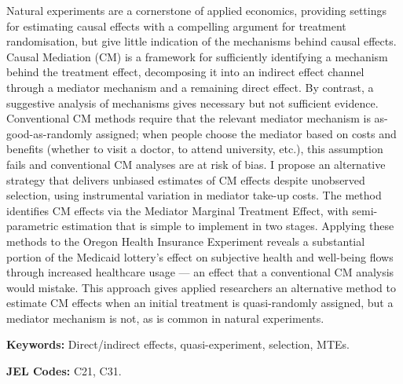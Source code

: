 \noindent
Natural experiments are a cornerstone of applied economics, providing settings for estimating causal effects with a compelling argument for treatment randomisation, but give little indication of the mechanisms behind causal effects.
Causal Mediation (CM) is a framework for sufficiently identifying a mechanism behind the treatment effect, decomposing it into an indirect effect channel through a mediator mechanism and a remaining direct effect.
By contrast, a suggestive analysis of mechanisms gives necessary but not sufficient evidence.
Conventional CM methods require that the relevant mediator mechanism is as-good-as-randomly assigned; when people choose the mediator based on costs and benefits (whether to visit a doctor, to attend university, etc.), this assumption fails and conventional CM analyses are at risk of bias.
I propose an alternative strategy that delivers unbiased estimates of CM effects despite unobserved selection, using instrumental variation in mediator take-up costs.
The method identifies CM effects via the Mediator Marginal Treatment Effect, with semi-parametric estimation that is simple to implement in two stages.
Applying these methods to the Oregon Health Insurance Experiment reveals a substantial portion of the Medicaid lottery's effect on subjective health and well-being flows through increased healthcare usage --- an effect that a conventional CM analysis would mistake.
This approach gives applied researchers an alternative method to estimate CM effects when an initial treatment is quasi-randomly assigned, but a mediator mechanism is not, as is common in natural experiments.

\vspace{0.5cm}
\noindent
\textbf{Keywords:}
Direct/indirect effects, quasi-experiment, selection, MTEs.

\vspace{0.1cm}
\noindent
\textbf{JEL Codes:}
C21, C31.
